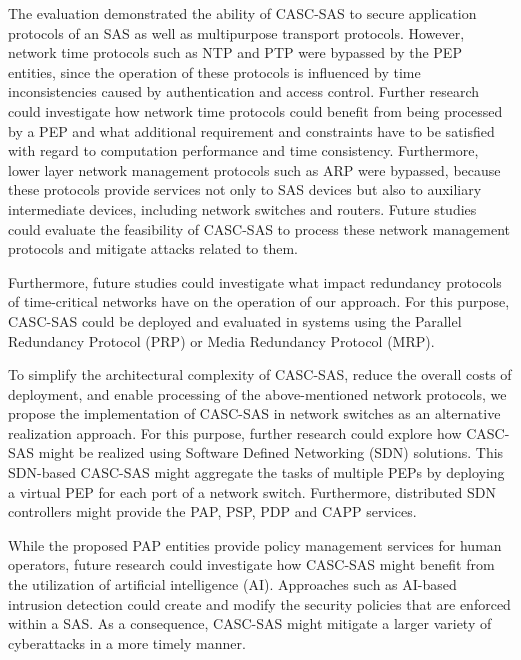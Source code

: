 The evaluation demonstrated the ability of CASC-SAS to secure application protocols of an SAS as well as multipurpose transport protocols.
However, network time protocols such as NTP and PTP were bypassed by the PEP entities, since the operation of these protocols is influenced by time inconsistencies caused by authentication and access control.
Further research could investigate how network time protocols could benefit from being processed by a PEP and what additional requirement and constraints have to be satisfied with regard to computation performance and time consistency.
Furthermore, lower layer network management protocols such as ARP were bypassed, because these protocols provide services not only to SAS devices but also to auxiliary intermediate devices, including network switches and routers.
Future studies could evaluate the feasibility of CASC-SAS to process these network management protocols and mitigate attacks related to them.

Furthermore, future studies could investigate what impact redundancy protocols of time-critical networks have on the operation of our approach.
For this purpose, CASC-SAS could be deployed and evaluated in systems using the Parallel Redundancy Protocol (PRP) or Media Redundancy Protocol (MRP). 

To simplify the architectural complexity of CASC-SAS, reduce the overall costs of deployment, and enable processing of the above-mentioned network protocols, we propose the implementation of CASC-SAS in network switches as an alternative realization approach.
For this purpose, further research could explore how CASC-SAS might be realized using Software Defined Networking (SDN) solutions.
This SDN-based CASC-SAS might aggregate the tasks of multiple PEPs by deploying a virtual PEP for each port of a network switch.
Furthermore, distributed SDN controllers might provide the PAP, PSP, PDP and CAPP services.

While the proposed PAP entities provide policy management services for human operators, future research could investigate how CASC-SAS might benefit from the utilization of artificial intelligence (AI).
Approaches such as AI-based intrusion detection could create and modify the security policies that are enforced within a SAS.
As a consequence, CASC-SAS might mitigate a larger variety of cyberattacks in a more timely manner.

